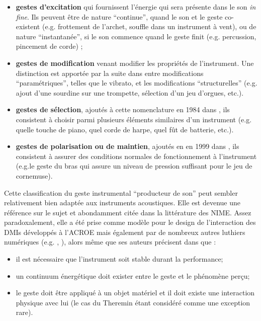 	\begin{itemize}[noitemsep]
		\item \textbf{gestes d'excitation} qui fournissent l'énergie qui sera présente dans le son \textit{in fine}. Ils peuvent être de nature ``continue'', quand le son et le geste co-existent (e.g. frottement de l'archet, souffle dans un instrument à vent), ou de nature ``instantanée'', si le son commence quand le geste finit (e.g. percussion, pincement de corde) \cite{cadoz_gesture_2000};
		\item \textbf{gestes de modification} venant modifier les propriétés de l'instrument. Une distinction est apportée par la suite dans \cite{cadoz_synthese_1983} entre modifications ``paramétriques'', telles que le vibrato, et les modifications ``structurelles'' (e.g. ajout d'une sourdine sur une trompette, sélection d'un jeu d'orgues, etc.).
		\item \textbf{gestes de sélection}, ajoutés à cette nomenclature en 1984 dans \cite{luciani_modelisation_1984}, ils consistent à choisir parmi plusieurs éléments similaires d'un instrument (e.g. quelle touche de piano, quel corde de harpe, quel fût de batterie, etc.).
		\item \textbf{gestes de polarisation ou de maintien}, ajoutés en en 1999 dans \cite{cadoz_gesture_2000}, ils consistent à assurer des conditions normales de fonctionnement à l'instrument (e.g.le geste du bras qui assure un niveau de pression suffisant pour le jeu de cornemuse).
\end{itemize}
\noindent Cette classification du geste instrumental ``producteur de son'' peut sembler relativement bien adaptée aux instruments acoustiques. Elle est devenue une référence sur le sujet et abondamment citée dans la littérature des \gls{NIME}. Assez paradoxalement, elle a été prise comme modèle pour le design de l'interaction des \glspl{DMI} développés à l'\gls{ACROE} mais également par de nombreux autres luthiers numériques (e.g. \cite{arfib_strategies_2002}, \cite{schwarz_sound_2012}), alors même que ses auteurs précisent dans \cite{cadoz_geste_1994, cadoz_gesture_2000} que :
\vspace{-1em}
	\begin{itemize}[noitemsep]
		\item il est nécessaire que l'instrument soit stable durant la performance;
		\item un continuum énergétique doit exister entre le geste et le phénomène perçu;
		\item le geste doit être appliqué à un objet matériel et il doit existe une interaction physique avec lui (le cas du Theremin étant considéré comme une exception rare).	
\end{itemize}
